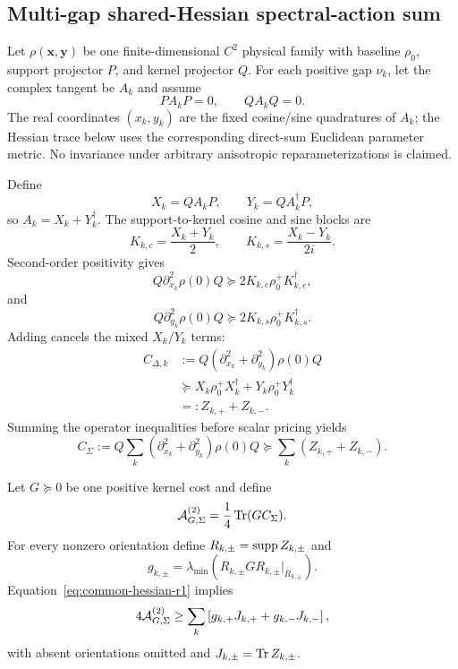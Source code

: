 
\subsection{Multi-gap shared-Hessian spectral-action sum}
\label{supp:multigap-full-proof-r1}

Let $\rho(\bm x,\bm y)$ be one finite-dimensional $C^2$ physical family with baseline $\rho_0$, support projector $P$, and kernel projector $Q$. For each positive gap $\nu_k$, let the complex tangent be $A_k$ and assume
\begin{equation}
P A_k P=0,
\qquad
Q A_k Q=0.
\end{equation}
The real coordinates $(x_k,y_k)$ are the fixed cosine/sine quadratures of $A_k$; the Hessian trace below uses the corresponding direct-sum Euclidean parameter metric. No invariance under arbitrary anisotropic reparameterizations is claimed.

Define
\begin{equation}
X_k=Q A_k P,
\qquad
Y_k=Q A_k^\dagger P,
\end{equation}
so $A_k=X_k+Y_k^\dagger$. The support-to-kernel cosine and sine blocks are
\begin{equation}
K_{k,c}=\frac{X_k+Y_k}{2},
\qquad
K_{k,s}=\frac{X_k-Y_k}{2i}.
\end{equation}
Second-order positivity gives
\begin{equation}
Q\partial_{x_k}^2\rho(0)Q
\succeq2K_{k,c}\rho_0^+K_{k,c}^\dagger,
\end{equation}
and
\begin{equation}
Q\partial_{y_k}^2\rho(0)Q
\succeq2K_{k,s}\rho_0^+K_{k,s}^\dagger.
\end{equation}
Adding cancels the mixed $X_k/Y_k$ terms:
\begin{align}
C_{\Delta,k}
&:=Q(\partial_{x_k}^2+\partial_{y_k}^2)\rho(0)Q\\
&\succeq
X_k\rho_0^+X_k^\dagger
+Y_k\rho_0^+Y_k^\dagger\\
&=:Z_{k,+}+Z_{k,-}.
\end{align}
Summing the operator inequalities before scalar pricing yields
\begin{equation}
\boxed{
C_\Sigma
:=Q\sum_k(\partial_{x_k}^2+\partial_{y_k}^2)\rho(0)Q
\succeq
\sum_k(Z_{k,+}+Z_{k,-}).
}
\label{eq:common-hessian-r1}
\end{equation}

Let $G\succeq0$ be one positive kernel cost and define
\begin{equation}
\mathcal A_{G,\Sigma}^{(2)}=\frac14\operatorname{Tr}(GC_\Sigma).
\end{equation}
For every nonzero orientation define $R_{k,\pm}=\operatorname{supp} Z_{k,\pm}$ and
\begin{equation}
g_{k,\pm}
=\lambda_{\min}(R_{k,\pm}GR_{k,\pm}|_{R_{k,\pm}}).
\end{equation}
Equation~\eqref{eq:common-hessian-r1} implies
\begin{equation}
4\mathcal A_{G,\Sigma}^{(2)}
\ge
\sum_k\left[g_{k,+}J_{k,+}+g_{k,-}J_{k,-}\right],
\label{eq:total-cost-r1}
\end{equation}
with absent orientations omitted and $J_{k,\pm}=\operatorname{Tr} Z_{k,\pm}$.

